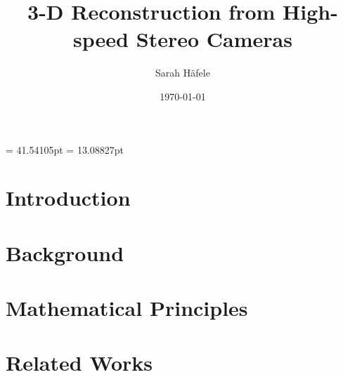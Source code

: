 

\evensidemargin = 41.54105pt
\oddsidemargin  = 13.08827pt


\presentdate{\today}						%
{}				%

\author{Sarah Häfele}
\title{3-D Reconstruction from High-speed Stereo Cameras}
\subject{Master-Thesis}
\publishers{Hochschule Furtwangen\\Fakultät Digitale Medien}
\date{\today}



\frontmatter
\maketitle					%
\clearpage
\clearpage
\tableofcontents			%

\mainmatter
\chapter{Introduction}\label{c:Intro}

\chapter{Background}\label{c:Background}
			

\chapter{Mathematical Principles}\label{c:Math}

\chapter{Related Works}\label{c:relatedWorks}
